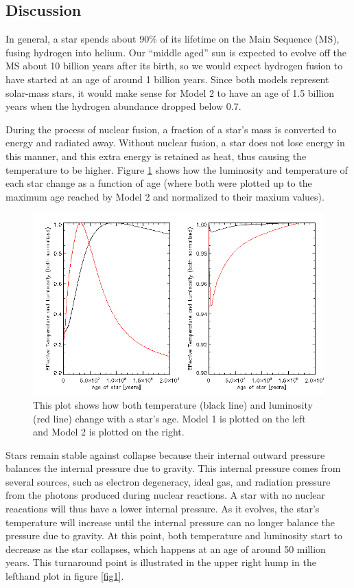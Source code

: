 \documentclass{article}
\begin{document}
\subsection{Discussion} In general, a star spends about 90\% of its lifetime on
the Main Sequence (MS), fusing hydrogen into helium.  Our ``middle aged'' sun
is expected to evolve off the MS about 10 billion years after its birth, so we
would expect hydrogen fusion to have started at an age of around 1 billion
years. Since both models represent solar-mass stars, it would make sense for
Model 2 to have an age of 1.5 billion years when the hydrogen abundance dropped
below 0.7.

During the process of nuclear fusion, a
fraction of a star's mass is converted to energy and radiated away.
Without nuclear fusion, a star does not lose energy in this manner,
and this extra energy is retained as heat, thus causing the
temperature to be higher. Figure \ref{fig3} shows how the
luminosity and temperature of each star change as a function
of age (where both were plotted up to the maximum age reached by 
Model 2 and normalized to their maxium values). 

\begin{figure}[h] 
\centering 
\includegraphics[width=6.0in]{fig3.png}
\caption{This plot shows how both temperature (black line) and luminosity (red 
line) change with a star's age. Model 1 is plotted on the left and Model 2 is 
plotted on the right.}
\label{fig3}
 \end{figure}



Stars remain stable against collapse because their internal outward pressure
balances the internal pressure due to gravity.
This internal pressure comes from several sources, such as electron
degeneracy, ideal gas, and radiation pressure from the photons produced
during nuclear reactions. A star with no nuclear reacations will thus have
a lower internal pressure. As it evolves, 
the star's temperature will
increase until the internal pressure can no longer balance the
pressure due to gravity. At this point, both temperature and luminosity
start to decrease as the star collapses, which happens at an age of around
 50 million years. This turnaround point is illustrated in 
the upper right hump in the lefthand plot in figure \ref{fig1}.
\end{document}
